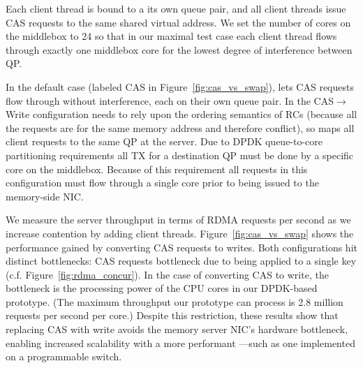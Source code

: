 Each client thread is bound to a its own queue pair, and all client
threads issue CAS requests to the same shared virtual address.  We
set the number of cores on the {\sword} middlebox to 24 so that in our maximal
test case each client thread flows through exactly one middlebox core
for the lowest degree of interference between QP.

In the default case (labeled CAS in Figure~\ref{fig:cas_vs_swap}),
{\sword} lets CAS requests flow through without interference, each
on their own queue pair.  In the CAS$\rightarrow$Write configuration
{\sword} needs to rely upon the ordering semantics of RCs (because all
the requests are for the same memory address and therefore
conflict), so maps all client requests to the same QP at the server.
Due to DPDK queue-to-core partitioning requirements all TX for a
destination QP must be done by a specific core on the
middlebox. Because of this requirement all requests in this
configuration must flow through a single core prior to being issued to
the memory-side NIC.


We measure the server throughput in terms of RDMA requests per second as
we increase contention by adding client threads.
Figure~\ref{fig:cas_vs_swap} shows the performance gained by
converting CAS requests to writes. Both configurations hit distinct
bottlenecks: CAS requests bottleneck due to being applied to a
single key (c.f. Figure~\ref{fig:rdma_concur}). In the case of
converting CAS to write, the bottleneck is the processing power of the
CPU cores in our DPDK-based {\sword} prototype. (The maximum throughput
our prototype can process is 2.8 million requests per second per
core.)
Despite this restriction, these results show that
replacing CAS with write avoids the memory server NIC's hardware
bottleneck, enabling increased scalability with a more performant
{\sword}---such as one implemented on a programmable switch.
